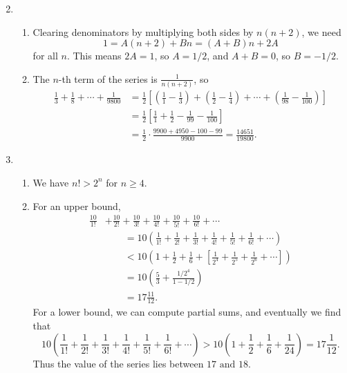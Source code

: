 \begin{enumerate}
\begin{equation*}
\end{equation*}
\item \begin{enumerate}
\item Clearing denominators by multiplying both sides by $n(n + 2)$, we need
\begin{equation*}
1 = A(n + 2) + Bn = (A + B)n + 2A
\end{equation*}
for all $n$. This means $2A = 1$, so $A = 1/2$, and $A + B = 0$, so $B = -1/2$.
\item The $n$-th term of the series is $\tfrac{1}{n(n + 2)}$, so 
\begin{align*} 
\frac{1}{3} + \frac{1}{8} + \cdots + \frac{1}{9800} &= \frac{1}{2}\left[\left(\frac{1}{1} - \frac{1}{3}\right) + \left(\frac{1}{2} - \frac{1}{4}\right) + \cdots + \left(\frac{1}{98} - \frac{1}{100}\right)\right] \\
&= \frac{1}{2}\left[\frac{1}{1} + \frac{1}{2} - \frac{1}{99} - \frac{1}{100}\right] \\
&= \frac{1}{2}\cdot\frac{9900 + 4950 - 100 - 99}{9900} = \frac{14651}{19800}.
\end{align*} 
\end{enumerate}
\item \begin{enumerate}
\item We have $n! > 2^n$ for $n\geq 4$.
\item For an upper bound,
\begin{align*}
\frac{10}{1!} &+ \frac{10}{2!} + \frac{10}{3!} + \frac{10}{4!} + \frac{10}{5!} + \frac{10}{6!} + \cdots \\
&\qquad = 10\left(\frac{1}{1!} + \frac{1}{2!} + \frac{1}{3!} + \frac{1}{4!} + \frac{1}{5!} + \frac{1}{6!} + \cdots\right) \\
&\qquad < 10\left(1 + \frac{1}{2} + \frac{1}{6} + \left[\frac{1}{2^4} + \frac{1}{2^5} + \frac{1}{2^6} + \cdots\right]\right) \\
&\qquad = 10\left(\frac{5}{3} + \frac{1/2^4}{1 - 1/2}\right) \\
&\qquad = 17\frac{11}{12}.
\end{align*}
For a lower bound, we can compute partial sums, and eventually we find that
\begin{equation*} 
10\left(\frac{1}{1!} + \frac{1}{2!} + \frac{1}{3!} + \frac{1}{4!} + \frac{1}{5!} + \frac{1}{6!} + \cdots\right) > 10\left(1 + \frac{1}{2} + \frac{1}{6} + \frac{1}{24}\right) = 17\frac{1}{12}.
\end{equation*}
Thus the value of the series lies between $\boxed{\text{17 and 18}}$.\par

\end{enumerate}
\end{enumerate}

